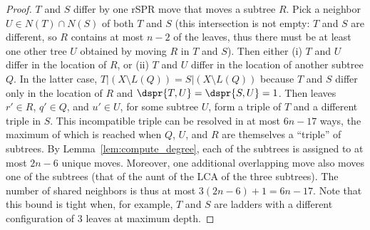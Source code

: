 \documentclass[11pt]{amsart}
\begin{document}
\sharedneighbors*
\begin{proof}
	$T$ and $S$ differ by one rSPR move that moves a subtree $R$.
	Pick a neighbor $U \in N(T) \cap N(S)$ of both $T$ and $S$ (this intersection is not empty: $T$ and $S$ are different, so $R$ contains at most $n-2$ of the leaves, thus there must be at least one other tree $U$ obtained by moving $R$ in $T$ and $S$).
	Then either (i) $T$ and $U$ differ in the location of $R$, or (ii) $T$ and $U$ differ in the location of another subtree $Q$.
	In the latter case, $T|(X \setminus L(Q)) = S|(X \setminus L(Q))$ because $T$ and $S$ differ only in the location of $R$ and $\dspr{T,U} = \dspr{S,U} = 1$.
	Then leaves $r' \in R$, $q' \in Q$, and $u' \in U$, for some subtree $U$, form a triple of $T$ and a different triple in $S$.
	This incompatible triple can be resolved in at most $6n - 17$ ways, the maximum of which is reached when $Q$, $U$, and $R$ are themselves a ``triple'' of subtrees.
	By Lemma~\ref{lem:compute_degree}, each of the subtrees is assigned to at most $2n-6$ unique moves.
	Moreover, one additional overlapping move also moves one of the subtrees (that of the aunt of the LCA of the three subtrees).
	The number of shared neighbors is thus at most $3(2n-6) + 1 = 6n-17$.
	Note that this bound is tight when, for example, $T$ and $S$ are ladders with a different configuration of 3 leaves at maximum depth.
\end{proof}
\end{document}

